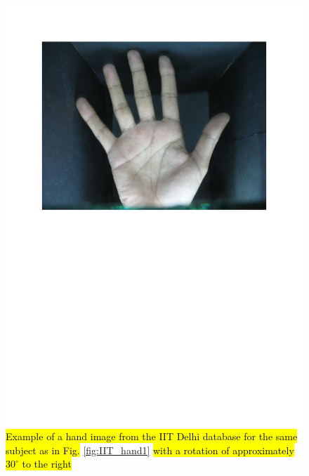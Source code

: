 \documentclass[review]{elsarticle}
\begin{document}
		\begin{figure}[!h]
		    \centering
		    \includegraphics[page=6,scale=.57,trim=1cm 14.7cm 1cm 1.7cm,clip]{IIT_samples.pdf}
		    \caption{\hl{Example of a hand image from the IIT Delhi database for the same subject as in Fig.} \ref{fig:IIT_hand1} \hl{with a rotation of approximately $30^{\circ}$ to the right}}
		    \label{fig:IIT_hand4}
		\end{figure}
\end{document}
